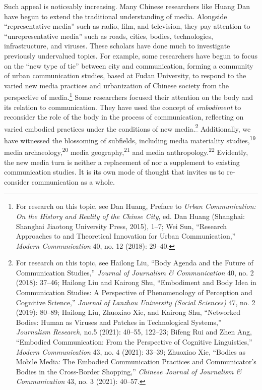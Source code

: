 \documentclass{tufte-handout}
\begin{document}
Such appeal is noticeably increasing. Many Chinese researchers like
Huang Dan have begun to extend the traditional understanding of media.
Alongside ``representative media'' such as radio, film, and television,
they pay attention to ``unrepresentative media'' such as roads, cities,
bodies, technologies, infrastructure, and viruses. These scholars have
done much to investigate previously undervalued topics. For example,
some researchers have begun to focus on the ``new type of tie'' between
city and communication, forming a community of urban communication
studies, based at Fudan University, to respond to the varied new media
practices and urbanization of Chinese society from the perspective of
media.\footnote{For research on this topic, see Dan Huang, Preface to
  \emph{Urban Communication: On the History and Reality of the Chinse
  City}, ed. Dan Huang (Shanghai: Shanghai Jiaotong University Press,
  2015), 1--7; Wei Sun, ``Research Approaches to and Theoretical
  Innovation for Urban Communication,'' \emph{Modern Communication} 40,
  no. 12 (2018): 29--40.} Some researchers focused their attention on
the body and its relation to communication. They have used the concept
of \emph{embodiment} to reconsider the role of the body in the process
of communication, reflecting on varied embodied practices under the
conditions of new media.\footnote{For research on this topic, see
  Hailong Liu, ``Body Agenda and the Future of Communication Studies,''
  \emph{Journal of Journalism \& Communication} 40, no. 2 (2018):
  37--46; Hailong Liu and Kairong Shu, ``Embodiment and Body Idea in
  Communication Studies: A Perspective of Phenomenology of Perception
  and Cognitive Science,'' \emph{Journal of Lanzhou University (Social
  Sciences)} 47, no. 2 (2019): 80--89; Hailong Liu, Zhuoxiao Xie, and
  Kairong Shu, ``Networked Bodies: Human as Viruses and Patches in
  Technological Systems,'' \emph{Journalism Research}, no.5 (2021):
  40--55, 122--23; Bifeng Rui and Zhen Ang, ``Embodied Communication:
  From the Perspective of Cognitive Linguistics,'' \emph{Modern
  Communication} 43, no. 4 (2021): 33--39; Zhuoxiao Xie, ``Bodies as
  Mobile Media: The Embodied Communication Practices and Communicator's
  Bodies in the Cross-Border Shopping,'' \emph{Chinese Journal of
  Journalism \& Communication} 43, no. 3 (2021): 40--57.} Additionally,
we have witnessed the blossoming of subfields, including media
materiality studies,\textsuperscript{19} media archaeology,\textsuperscript{20} media
geography,\textsuperscript{21} and
media anthropology.\textsuperscript{22} Evidently, the new media turn is neither a
replacement of nor a supplement to existing communication studies. It is
its own mode of thought that invites us to re-consider communication as
a whole.
\end{document}
